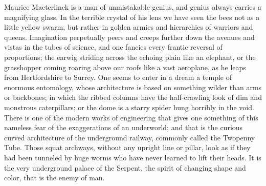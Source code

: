 \documentclass{book}
\begin{document}
Maurice Maeterlinck is a man of unmistakable genius, and genius always carries a magnifying glass. In the terrible crystal of his lens we have seen the bees not as a little yellow swarm, but rather in golden armies and hierarchies of warriors and queens. Imagination perpetually peers and creeps further down the avenues and vistas in the tubes of science, and one fancies every frantic reversal of proportions; the earwig striding across the echoing plain like an elephant, or the grasshopper coming roaring above our roofs like a vast aeroplane, as he leaps from Hertfordshire to Surrey. One seems to enter in a dream a temple of enormous entomology, whose architecture is based on something wilder than arms or backbones; in which the ribbed columns have the half-crawling look of dim and monstrous caterpillars; or the dome is a starry spider hung horribly in the void. There is one of the modern works of engineering that gives one something of this nameless fear of the exaggerations of an underworld; and that is the curious curved architecture of the underground railway, commonly called the Twopenny Tube. Those squat archways, without any upright line or pillar, look as if they had been tunneled by huge worms who have never learned to lift their heads. It is the very underground palace of the Serpent, the spirit of changing shape and color, that is the enemy of man.
\end{document}
